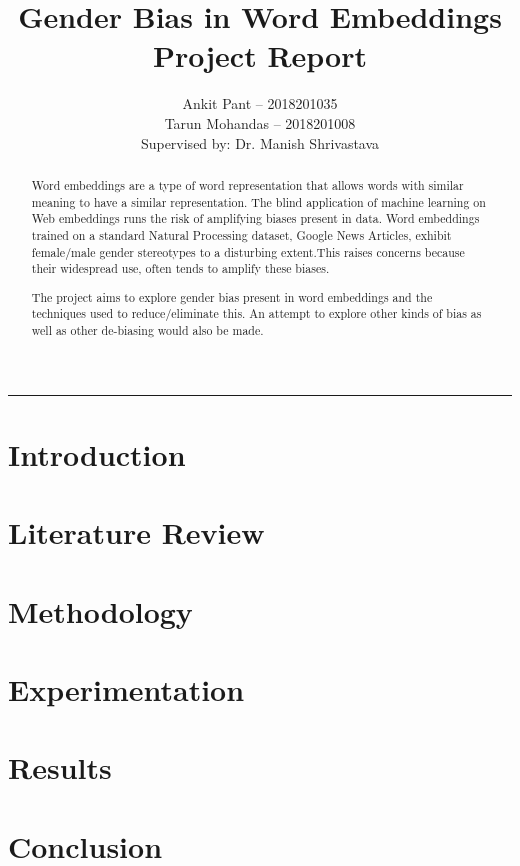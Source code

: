 \documentclass[12pt, a4paper]{article}
\title{\Huge{Gender Bias in Word Embeddings}\\ \vspace{2mm} \Large{Project Report}}
\author{Ankit Pant -- 2018201035 \\ Tarun Mohandas -- 2018201008 \\
	Supervised by: Dr. Manish Shrivastava}
\date{}
\begin{document}
	\maketitle
	\thispagestyle{empty}
	\noindent\rule{\textwidth}{1pt}
	\newpage
	\setcounter{page}{1}
	\begin{abstract}
		Word embeddings are a type of word representation that allows words with similar meaning to have a similar representation. The blind application of machine learning on Web embeddings runs the risk of amplifying biases present in data. Word embeddings trained on a standard Natural Processing dataset, Google News Articles, exhibit female/male gender stereotypes to a disturbing extent.This raises concerns because their widespread use, often tends to amplify these biases.
		\par The project aims to explore gender bias present in word embeddings and the techniques used to reduce/eliminate this. An attempt to explore other kinds of bias as well as other de-biasing would also be made.
	\end{abstract}
	\newpage
	
	\tableofcontents
	\newpage
	
	\setcounter{page}{1}
	
	\section{Introduction}
		
		
	\section{Literature Review}
		
		
	\section{Methodology}
		
		
	\section{Experimentation}
		
		
	\section{Results}
		
		
	\section{Conclusion}
		
\end{document}
